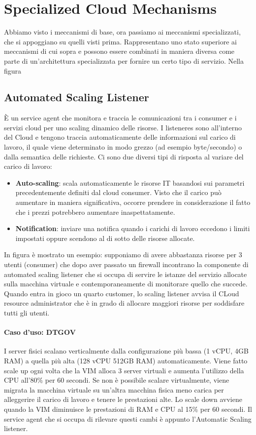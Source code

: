 \chapter{Specialized Cloud Mechanisms}
Abbiamo visto i meccanismi di base, ora passiamo ai meccanismi specializzati, che si appoggiano su quelli visti prima. Rappresentano uno stato superiore ai meccanismi di cui sopra e possono essere combinati in maniera diversa come parte di un'architettura specializzata per fornire un certo tipo di servizio. Nella figura 

\section{Automated Scaling Listener}
È un service agent che monitora e traccia le comunicazioni tra i consumer e i servizi cloud per uno scaling dinamico delle risorse. I listeneres sono all'interno del Cloud e tengono traccia automaticamente delle informazioni sul carico di lavoro, il quale viene determinato in modo grezzo (ad esempio byte/secondo) o dalla semantica delle richieste. Ci sono due diversi tipi di risposta al variare del carico di lavoro:
\begin{itemize}
    \item \textbf{Auto-scaling}: scala automaticamente le risorse IT basandosi sui parametri precedentemente definiti dal cloud consumer. Visto che il carico può aumentare in maniera significativa, occorre prendere in considerazione il fatto che i prezzi potrebbero aumentare inaspettatamente.
    \item \textbf{Notification}: inviare una notifica  quando i carichi di lavoro eccedono i limiti impostati oppure scendono al di sotto delle risorse allocate. 
\end{itemize}
In figura è mostrato un esempio: supponiamo di avere abbastanza risorse per 3 utenti (consumer) che dopo aver passato un firewall incontrano la componente di automated scaling listener che si occupa di servire le istanze del servizio allocate sulla macchina virtuale e contemporaneamente di monitorare quello che succede. Quando entra in gioco un quarto customer, lo scaling listener avvisa il CLoud resource administrator che è in grado di allocare maggiori risorse per soddisfare tutti gli utenti.



\subsubsection{\textbf{Caso d'uso: DTGOV}}
I server fisici scalano verticalmente dalla configurazione più bassa (1 vCPU, 4GB RAM) a quella più alta (128 vCPU 512GB RAM) automaticamente. Viene fatto scale up ogni volta che la VIM alloca 3 server virtuali e aumenta l'utilizzo della CPU all'80\% per 60 secondi. Se non è possibile scalare virtualmente, viene migrata la macchina virtuale su un'altra macchina fisica meno carica per alleggerire il carico di lavoro e tenere le prestazioni alte. Lo scale down avviene quando la VIM diminuisce le prestazioni di RAM e CPU al 15\% per 60 secondi. Il service agent che si occupa di rilevare questi cambi è appunto l'Automatic Scaling listener.

